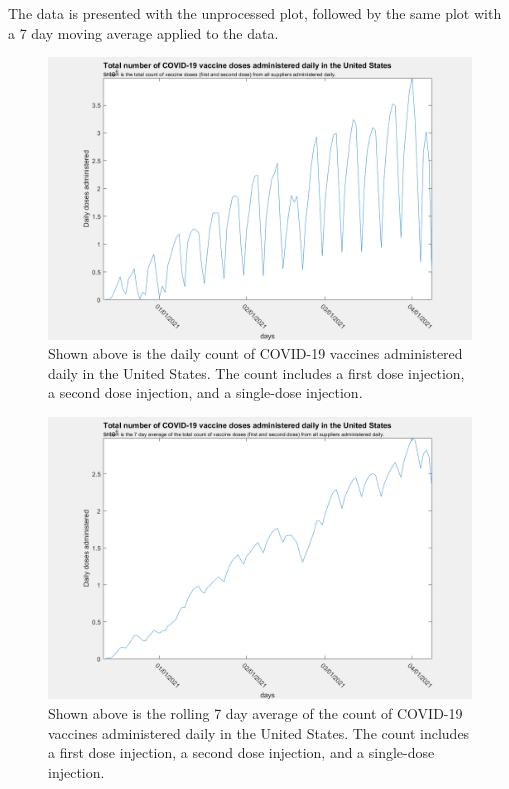 \documentclass[twoside]{article}
\begin{document}
\begin{multicols}{2}
The data is presented with the unprocessed plot, followed by the same plot with a 7 day moving average applied to the data. 

\begin{figure}[H]
	\includegraphics[width=\linewidth]{images/usa_daily_total_doses_unprocessed.png}
	\caption{Shown above is the daily count of COVID-19 vaccines administered daily in the United States. The count includes a first dose injection, a second dose injection, and a single-dose injection.}
	\label{fig:images/usa_daily_total_doses_unprocessedLabel}
\end{figure}

\begin{figure}[H]
	\includegraphics[width=\linewidth]{images/usa_daily_total_doses_processed.png}
	\caption{Shown above is the rolling 7 day average of the count of COVID-19 vaccines administered daily in the United States. The count includes a first dose injection, a second dose injection, and a single-dose injection.}
	\label{fig:images/usa_daily_total_doses_processedLabel}
\end{figure}


\end{multicols}
\end{document}
